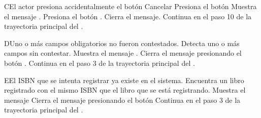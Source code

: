 
\begin{UCtrayectoriaA}{C}{El actor presiona accidentalmente el botón Cancelar}
    \UCpaso[\UCactor] Presiona el botón 
    \UCpaso Muestra el mensaje .
    \UCpaso[\UCactor] Presiona el botón .
    \UCpaso Cierra el mensaje.
    \UCpaso Continua en el paso 10 de la trayectoria principal del .
\end{UCtrayectoriaA}


\begin{UCtrayectoriaA}{D}{Uno o más campos obligatorios no fueron contestados.}
    \UCpaso Detecta uno o más campos sin contestar.
    \UCpaso Muestra el mensaje .
    \UCpaso[\UCactor] Cierra el mensaje presionando el botón .
    \UCpaso Continua en el paso 3 de la trayectoria principal del .
\end{UCtrayectoriaA}


\begin{UCtrayectoriaA}{E}{El ISBN que se intenta registrar ya existe en el sistema.}
    \UCpaso Encuentra un libro registrado con el mismo ISBN que el libro que se está registrando.
    \UCpaso Muestra el mensaje 
    \UCpaso[\UCactor] Cierra el mensaje presionando el botón 
    \UCpaso Continua en el paso 3 de la trayectoria principal del .
\end{UCtrayectoriaA}